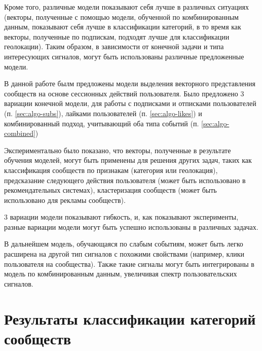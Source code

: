 \documentclass[times,specification,annotation]{itmo-student-thesis}
\begin{document}
Кроме того, различные модели показывают себя лучше в различных ситуациях (векторы, полученные с помощью модели, обученной по комбинированным данным, показывают себя лучше в классификации категорий, в то время как векторы, полученные по подпискам, подходят лучше для классификации геолокации). Таким образом, в зависимости от конечной задачи и типа интересующих сигналов, могут быть использованы различные предложенные модели.  


\startconclusionpage

В данной работе былм предложены модели выделения векторного представления сообществ на основе сессионных действий пользователя. Было предложено 3 вариации конечной модели, для работы с подписками и отписками пользователей (п. \ref{sec:algo-subs}), лайками пользователей (п. \ref{sec:algo-likes}) и комбинированный подход, учитывающий оба типа событий (п. \ref{sec:algo-combined})

Экспериментально было показано, что векторы, полученные в результате обучения моделей, могут быть применены для решения других задач, таких как классификация сообществ по признакам (категория или геолокация), предсказание следующего действия пользователя (может быть использовано в рекомендательных системах), кластеризация сообществ (может быть использовано для рекламы сообществ).

3 вариации модели показывают гибкость, и, как показывают эксперименты, разные вариации модели могут быть успешно использованы в различных задачах. 

В дальнейшем модель, обучающаяся по слабым событиям, может быть легко расширена на другой тип сигналов с похожими свойствами (например, клики пользователя на сообщества). Также такие сигналы могут быть интегрированы в модель по комбинированным данным, увеличивая спектр пользовательских сигналов. 

\printmainbibliography

\appendix

\chapter{Результаты классификации категорий сообществ}\label{app}
\end{document}
